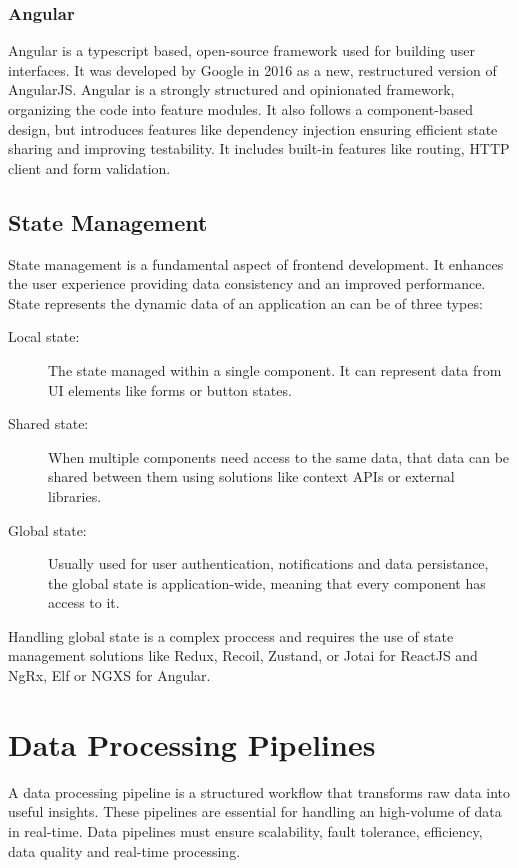 \subsubsection{Angular}
Angular is a typescript based, open-source framework used for building user
interfaces. It was developed by Google in 2016 as a new, restructured version
of AngularJS. Angular is a strongly structured and opinionated framework,
organizing the code into feature modules. It also follows a component-based
design, but introduces features like dependency injection ensuring efficient
state sharing and improving testability.
It includes built-in features like routing, \gls{HTTP} client and form validation.

\subsection{State Management}
State management is a fundamental aspect of frontend development. It enhances
the user experience providing data consistency and an improved performance.
State represents the dynamic data of an application an can be of three types:

\begin{description}

	\item[Local state:] The state managed within a single component. It can
	      represent data from \gls{UI} elements like forms or button states.

	\item[Shared state:] When multiple components need access to the same data,
	      that data can be shared between them using solutions like context \gls{API}s or
	      external libraries.

	\item[Global state:] Usually used for user authentication, notifications and
	      data persistance, the global state is application-wide, meaning that
	      every component has access to it.
\end{description}

Handling global state is a complex proccess and requires the use of state
management solutions like Redux, Recoil, Zustand, or Jotai for ReactJS and
NgRx, Elf or NGXS for Angular.

\section{Data Processing Pipelines}
A data processing pipeline is a structured workflow that transforms raw data
into useful insights. These pipelines are essential for handling an high-volume
of data in real-time. Data pipelines must ensure scalability, fault tolerance,
efficiency, data quality and real-time processing.

